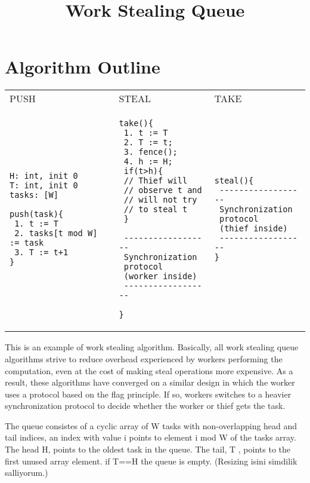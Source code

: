 \documentclass[a4paper]{article}
\title{Work Stealing Queue}
\begin{document}
\maketitle

\noindent 
\section{Algorithm Outline}

\begin{tabular}{|p{3.6cm}|p{3.6cm}|p{3.6cm}|}
PUSH & STEAL & TAKE \\

\begin{lstlisting}
H: int, init 0
T: int, init 0
tasks: [W]

push(task){
 1. t := T
 2. tasks[t mod W] := task
 3. T := t+1
}
\end{lstlisting} &

\begin{lstlisting}
take(){
 1. t := T
 2.	T := t;
 3. fence();
 4. h := H;
 if(t>h){
 // Thief will 
 // observe t and 
 // will not try
 // to steal t 
 }

 ------------------
 Synchronization 
 protocol        
 (worker inside) 
 ------------------
 
}

\end{lstlisting} &

\begin{lstlisting}
steal(){ 
 ------------------
 Synchronization 
 protocol        
 (thief inside)  
 ------------------
}

\end{lstlisting} 

\end{tabular}
\newline

This is an example of work stealing algorithm. Basically, all work stealing queue algorithms strive to reduce overhead experienced by workers performing the computation, even at the cost of making steal operations more expensive.  As a result, these algorithms have converged on a similar design in which the worker uses a protocol based on the flag principle. If so, workers switches to a heavier synchronization protocol to decide whether the worker or thief gets the task.

The queue consistes of a cyclic array of W tasks with non-overlapping head and tail indices, an index with value i points to element i mod W of the tasks array. The head H, points to the oldest task in the queue. The tail, T , points to the first unused array element. if T==H the queue is empty. (Resizing isini simdilik salliyorum.)
\end{document}
